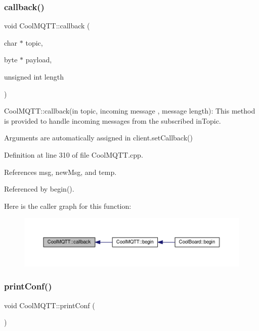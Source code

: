 \subsubsection{\texorpdfstring{callback()}{callback()}}
{\footnotesize\ttfamily void Cool\+M\+Q\+T\+T\+::callback (\begin{DoxyParamCaption}\item[{char $\ast$}]{topic,  }\item[{byte $\ast$}]{payload,  }\item[{unsigned int}]{length }\end{DoxyParamCaption})}

Cool\+M\+Q\+T\+T\+::callback(in topic, incoming message , message length)\+: This method is provided to handle incoming messages from the subscribed in\+Topic.

Arguments are automatically assigned in client.\+set\+Callback() 

Definition at line 310 of file Cool\+M\+Q\+T\+T.\+cpp.



References msg, new\+Msg, and temp.



Referenced by begin().

Here is the caller graph for this function\+:
\nopagebreak
\begin{figure}[H]
\begin{center}
\leavevmode
\includegraphics[width=350pt]{d0/dd0/class_cool_m_q_t_t_a30d82ad665bfb603f46ecdbc290775df_icgraph}
\end{center}
\end{figure}
\mbox{\label{class_cool_m_q_t_t_a40553a0ad4b5ecf1cb4411ab54ca85fb}} 
\subsubsection{\texorpdfstring{print\+Conf()}{printConf()}}
{\footnotesize\ttfamily void Cool\+M\+Q\+T\+T\+::print\+Conf (\begin{DoxyParamCaption}{ }\end{DoxyParamCaption})}

